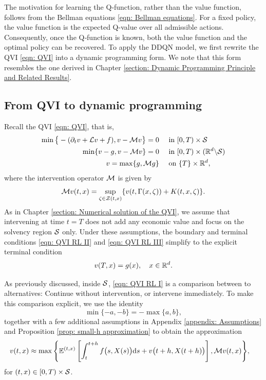 The motivation for learning the Q‑function, rather than the value function, follows from the Bellman equations \eqref{eqn: Bellman equations}. For a fixed policy, the value function is the expected Q-value over all admissible actions. Consequently, once the Q‑function is known, both the value function and the optimal policy can be recovered. To apply the DDQN model, we first rewrite the QVI \eqref{eqn: QVI} into a dynamic programming form. We note that this form resembles the one derived in Chapter \ref{section: Dynamic Programming Principle and Related Results}.

\subsection{From QVI to dynamic programming}
Recall the QVI \eqref{eqn: QVI}, that is, 
\begin{align}
    \min\big\{ - (\partial_t v + \mathcal{L} v + f), v - \mathcal{M} v \big\} = 0& \quad \text{ in } [0,T) \times \mathcal{S} \label{eqn: QVI RL I} \\
    \min \{v - g, v - \mathcal{M} v \} = 0 & \quad \text{ in } [0,T) \times (\mathbb{R}^d \backslash \mathcal{S}) \label{eqn: QVI RL II} \\
    v = \max\{g, \mathcal{M} g \} & \quad \text{ on } \{T\} \times \mathbb{R}^d \label{eqn: QVI RL III}, 
\end{align}
where the intervention operator $\mathcal{M}$ is given by
\begin{equation*}
    \mathcal{M} v(t,x) = \sup_{\zeta \in \mathcal{Z}(t,x)} \{v(t,\Gamma(x,\zeta)) + K(t,x,\zeta)\}.
\end{equation*}
As in Chapter \ref{section: Numerical solution of the QVI}, we assume that intervening at time $t=T$ does not add any economic value and focus on the solvency region $\mathcal{S}$ only. Under these assumptions, the boundary and terminal conditions \eqref{eqn: QVI RL II} and \eqref{eqn: QVI RL III} simplify to the explicit terminal condition
\begin{equation*}
    v(T,x) = g(x), \quad x \in \mathbb{R}^d. 
\end{equation*}

As previously discussed, inside $\mathcal{S}$, \eqref{eqn: QVI RL I} is a comparison between to alternatives: Continue without intervention, or intervene immediately. To make this comparison explicit, we use the identity 
\begin{equation*}
    \min\{-a,-b\} = -\max\{a,b\},
\end{equation*}
together with a few additional assumptions in Appendix \ref{appendix: Assumptions} and Proposition \ref{prop: small-h approximation} to obtain the approximation
\begin{align}
    v(t,x) \approx \max \Bigg\{ \mathbb{E}^{(t,x)} & \left[ \int_{t}^{t+h} f\big(s,X(s)\big) \mathrm{d} s + v\big(t+h,X(t+h) \big) \right], \mathcal{M} v(t,x) \Bigg\}, \label{eqn: QVI RL I DP}
\end{align}
for $(t,x) \in [0,T) \times \mathcal{S}$. 

